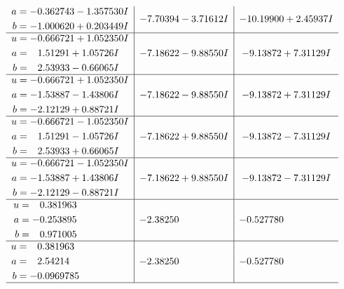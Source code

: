 \documentclass[1p]{elsarticle_modified}
\theoremstyle{definition}
\begin{document}
$$\begin{array}{c|c|c}
\begin{aligned}
a &= -0.362743 - 1.357530 I \\
b &= -1.000620 + 0.203449 I\end{aligned}
 & -7.70394 - 3.71612 I & -10.19900 + 2.45937 I \\ \hline\begin{aligned}
u &= -0.666721 + 1.052350 I \\
a &= \phantom{-}1.51291 + 1.05726 I \\
b &= \phantom{-}2.53933 - 0.66065 I\end{aligned}
 & -7.18622 - 9.88550 I & -9.13872 + 7.31129 I \\ \hline\begin{aligned}
u &= -0.666721 + 1.052350 I \\
a &= -1.53887 - 1.43806 I \\
b &= -2.12129 + 0.88721 I\end{aligned}
 & -7.18622 - 9.88550 I & -9.13872 + 7.31129 I \\ \hline\begin{aligned}
u &= -0.666721 - 1.052350 I \\
a &= \phantom{-}1.51291 - 1.05726 I \\
b &= \phantom{-}2.53933 + 0.66065 I\end{aligned}
 & -7.18622 + 9.88550 I & -9.13872 - 7.31129 I \\ \hline\begin{aligned}
u &= -0.666721 - 1.052350 I \\
a &= -1.53887 + 1.43806 I \\
b &= -2.12129 - 0.88721 I\end{aligned}
 & -7.18622 + 9.88550 I & -9.13872 - 7.31129 I \\ \hline\begin{aligned}
u &= \phantom{-}0.381963\phantom{ +0.000000I} \\
a &= -0.253895\phantom{ +0.000000I} \\
b &= \phantom{-}0.971005\phantom{ +0.000000I}\end{aligned}
 & -2.38250\phantom{ +0.000000I} & -0.527780\phantom{ +0.000000I} \\ \hline\begin{aligned}
u &= \phantom{-}0.381963\phantom{ +0.000000I} \\
a &= \phantom{-}2.54214\phantom{ +0.000000I} \\
b &= -0.0969785\phantom{ +0.000000I}\end{aligned}
 & -2.38250\phantom{ +0.000000I} & -0.527780\phantom{ +0.000000I}\\
 \hline 
 \end{array}$$\newpage\newpage\renewcommand{\arraystretch}{1}
\end{document}
